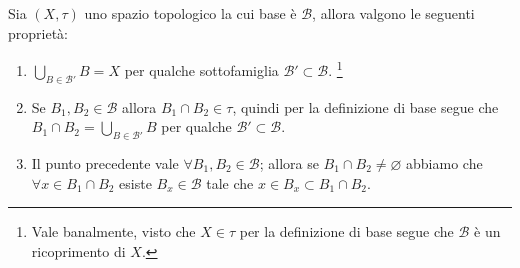 \begin{remark}
	Sia $(X, \tau)$ uno spazio topologico la cui base è $\mathcal{B}$, allora valgono le seguenti proprietà:
	\begin{enumerate}
		\item $\bigcup_{B \in \mathcal{B}'} B = X$ per qualche sottofamiglia $\mathcal{B}' \subset \mathcal{B}$. 
		\footnote{Vale banalmente, visto che $X \in \tau$ per la definizione di base segue che $\mathcal{B}$ è un ricoprimento di $X$.}
		\item Se $B_1, B_2 \in \mathcal{B}$ allora $B_1 \cap B_2 \in \tau$, quindi per la definizione di base segue che $B_1 \cap B_2  = \bigcup_{B \in \mathcal{B}'} B$ per qualche $\mathcal{B}' \subset \mathcal{B}$.
		\item Il punto precedente vale $\forall B_1, B_2 \in \mathcal{B}$; allora se $B_1 \cap B_2 \neq \varnothing$ abbiamo che $\forall x \in B_1 \cap B_2$ esiste $B_x \in \mathcal{B}$ tale che $x \in B_x \subset B_1 \cap B_2$.
	\end{enumerate}
\end{remark}

